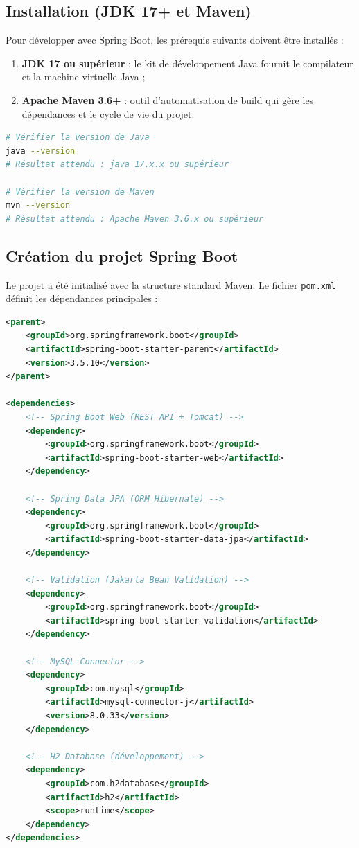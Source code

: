 \subsection{Installation (JDK 17+ et Maven)}

Pour développer avec Spring Boot, les prérequis suivants doivent être installés :

\begin{enumerate}[noitemsep]
    \item \textbf{JDK 17 ou supérieur} : le kit de développement Java fournit le compilateur et la machine virtuelle Java ;
    \item \textbf{Apache Maven 3.6+} : outil d'automatisation de build qui gère les dépendances et le cycle de vie du projet.
\end{enumerate}

\begin{lstlisting}[language=bash,caption={Vérification des installations}]
# Vérifier la version de Java
java --version
# Résultat attendu : java 17.x.x ou supérieur

# Vérifier la version de Maven
mvn --version
# Résultat attendu : Apache Maven 3.6.x ou supérieur
\end{lstlisting}

\subsection{Création du projet Spring Boot}

Le projet a été initialisé avec la structure standard Maven. Le fichier \texttt{pom.xml} définit les dépendances principales :

\begin{lstlisting}[language=XML,caption={Extrait du fichier pom.xml — Dépendances principales}]
<parent>
    <groupId>org.springframework.boot</groupId>
    <artifactId>spring-boot-starter-parent</artifactId>
    <version>3.5.10</version>
</parent>

<dependencies>
    <!-- Spring Boot Web (REST API + Tomcat) -->
    <dependency>
        <groupId>org.springframework.boot</groupId>
        <artifactId>spring-boot-starter-web</artifactId>
    </dependency>

    <!-- Spring Data JPA (ORM Hibernate) -->
    <dependency>
        <groupId>org.springframework.boot</groupId>
        <artifactId>spring-boot-starter-data-jpa</artifactId>
    </dependency>

    <!-- Validation (Jakarta Bean Validation) -->
    <dependency>
        <groupId>org.springframework.boot</groupId>
        <artifactId>spring-boot-starter-validation</artifactId>
    </dependency>

    <!-- MySQL Connector -->
    <dependency>
        <groupId>com.mysql</groupId>
        <artifactId>mysql-connector-j</artifactId>
        <version>8.0.33</version>
    </dependency>

    <!-- H2 Database (développement) -->
    <dependency>
        <groupId>com.h2database</groupId>
        <artifactId>h2</artifactId>
        <scope>runtime</scope>
    </dependency>
</dependencies>
\end{lstlisting}

